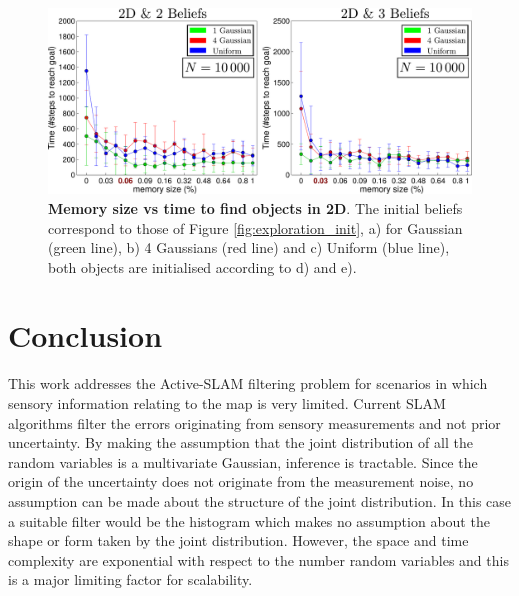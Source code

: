 \begin{figure}
  \centering
  \includegraphics[width=\textwidth]{./ch5-MLMF/Figures/exper_mem_all.pdf}
  \caption{\textbf{Memory size vs time to find objects in 2D}. The initial beliefs correspond 
  to those of Figure \ref{fig:exploration_init}, a) for Gaussian (green line), b) 4 Gaussians (red line)
  and c) Uniform (blue line), both objects are initialised according to d) and e).}
   \label{fig:time_to_reach_goal_2D}
\end{figure}



\FloatBarrier
\section{Conclusion}\label{ch5:conclusion}

This work addresses the Active-SLAM filtering problem for scenarios in which sensory information relating to the map is very limited. Current
SLAM algorithms filter the errors originating from sensory measurements and not prior uncertainty. By making the assumption
that the joint distribution of all the random variables is a multivariate Gaussian, inference is tractable. Since the origin of 
the uncertainty does not originate from the measurement noise, no assumption can be made about the structure of the joint distribution.
In this case a suitable filter would be the histogram which makes no assumption about the shape or form taken by the joint distribution. 
However, the space and time complexity are exponential with respect to the number random variables and this is a major 
limiting factor for scalability. 

